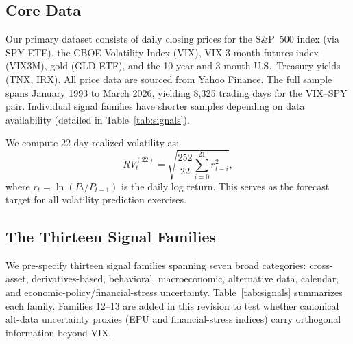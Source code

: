 \documentclass[12pt,a4paper]{article}
\begin{document}
\subsection{Core Data}

Our primary dataset consists of daily closing prices for the S\&P~500 index (via SPY ETF), the CBOE Volatility Index (VIX), VIX 3-month futures index (VIX3M), gold (GLD ETF), and the 10-year and 3-month U.S.\ Treasury yields (TNX, IRX). All price data are sourced from Yahoo Finance. The full sample spans January 1993 to March 2026, yielding 8,325 trading days for the VIX--SPY pair. Individual signal families have shorter samples depending on data availability (detailed in Table~\ref{tab:signals}).

We compute 22-day realized volatility as:
\begin{equation}
RV_{t}^{(22)} = \sqrt{\frac{252}{22} \sum_{i=0}^{21} r_{t-i}^2},
\label{eq:rv}
\end{equation}
where $r_t = \ln(P_t/P_{t-1})$ is the daily log return. This serves as the forecast target for all volatility prediction exercises.

\subsection{The Thirteen Signal Families}

We pre-specify thirteen signal families spanning seven broad categories: cross-asset, derivatives-based, behavioral, macroeconomic, alternative data, calendar, and economic-policy/financial-stress uncertainty. Table~\ref{tab:signals} summarizes each family. Families 12--13 are added in this revision to test whether canonical alt-data uncertainty proxies (EPU and financial-stress indices) carry orthogonal information beyond VIX.
\end{document}
